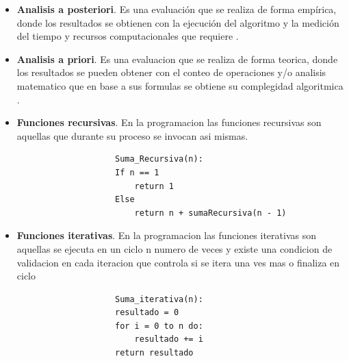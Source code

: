 \documentclass[12pt,twoside]{article}
\begin{document}
\begin{itemize}
\item \textbf{Analisis a posteriori}. Es una evaluación que se realiza de forma empírica, donde los resultados se obtienen con la ejecución del algoritmo y la medición del tiempo y recursos computacionales que requiere \cite{concep1}.

\item \textbf{Analisis a priori}. Es una evaluacion que se realiza de forma teorica, donde los resultados se pueden obtener con el conteo de operaciones y/o analisis matematico que en base a sus formulas se obtiene su complegidad algoritmica \cite{concep1}.

\item \textbf{Funciones recursivas}. En la programacion las funciones recursivas son aquellas que durante su proceso se invocan asi mismas.

\begin{centering}
\begin{verbatim}
                    Suma_Recursiva(n):
                    If n == 1
                        return 1 
                    Else
                        return n + sumaRecursiva(n - 1)
\end{verbatim}
\end{centering}

\item \textbf{Funciones iterativas}. En la programacion las funciones iterativas son aquellas se ejecuta en un ciclo n numero de veces y existe una condicion de validacion en cada iteracion que controla si se itera una ves mas o finaliza en ciclo

\begin{centering}
\begin{verbatim}
                    Suma_iterativa(n):
                    resultado = 0
                    for i = 0 to n do:
                        resultado += i
                    return resultado
\end{verbatim}
\end{centering} 


\end{itemize}
\end{document}
